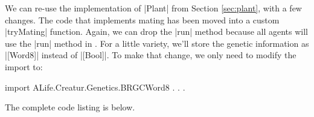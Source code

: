 We can re-use the implementation of |Plant| from Section \ref{sec:plant},
with a few changes.
The code that implements mating has been moved into a custom
|tryMating| function.
Again, we can drop the |run| method because
all agents will use the |run| method in .
For a little variety, we'll store the genetic information as |[Word8]|
instead of |[Bool]|.
To make that change, we only need to modify the import to:

\begin{code}
import ALife.Creatur.Genetics.BRGCWord8 . . .
\end{code}

The complete code listing is below.


